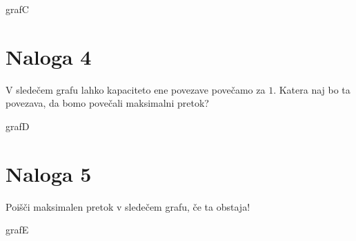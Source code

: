 \documentclass[14pt]{extarticle}
\begin{document}
\begin{pretok}{grafC}
\end{pretok}

\clearpage

\section*{Naloga 4}

V sledečem grafu lahko kapaciteto ene povezave povečamo za $1$. Katera naj bo ta povezava, da bomo povečali maksimalni pretok?

\begin{pretok}{grafD}
\end{pretok}

\clearpage

\section*{Naloga 5}

Poišči maksimalen pretok v sledečem grafu, če ta obstaja!

\begin{pretok}{grafE}
\end{pretok}
\end{document}
